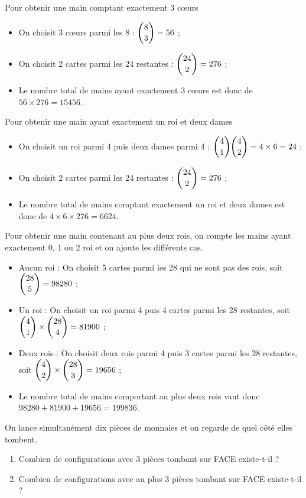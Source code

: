 \documentclass[11pt,fleqn, openany]{book} %
\begin{document}
\begin{solution}Pour obtenir une main comptant exactement 3 cœurs
\begin{itemize}
\item On choisit 3 cœurs parmi les 8 : $\dbinom{8}{3}=56$ ;
\item On choisit 2 cartes parmi les 24 restantes : $\dbinom{24}{2}=276$ ;
\item Le nombre total de mains ayant exactement 3 cœurs est donc de $56 \times 276 = 	15456$.
\end{itemize}

Pour obtenir une main ayant exactement un roi et deux dames
\begin{itemize}
\item On choisit un roi parmi 4 puis deux dames parmi 4 : $\dbinom{4}{1} \dbinom{4}{2}=4 \times 6 = 24$ ;
\item On choisit 2 cartes parmi les 24 restantes : $\dbinom{24}{2}=276$ ;
\item Le nombre total de mains comptant exactement un roi et deux dames est donc de $4 \times 6 \times 276=6624$.\end{itemize}

Pour obtenir une main contenant au plus deux rois, on compte les mains ayant exactement 0, 1 ou 2 roi et on ajoute les différents cas.
\begin{itemize}
\item Aucun roi : On choisit 5 cartes parmi les 28 qui ne sont pas des rois, soit $\dbinom{28}{5}=98280$ ;
\item Un roi : On choisit un roi parmi 4 puis 4 cartes parmi les 28 restantes, soit $\dbinom{4}{1} \times \dbinom{28}{4}=81900$ ;
\item Deux rois : On choisit deux rois parmi 4 puis 3 cartes parmi les 28 restantes, soit $\dbinom{4}{2} \times \dbinom{28}{3}=19656$ ;
\item Le nombre total de mains comportant au plus deux rois vaut donc $98280+81900+19656=199836$.
\end{itemize}\end{solution}





\begin{exercise}
On lance simultanément dix pièces de monnaies et on regarde de quel côté elles tombent.
\begin{enumerate}
\item Combien de configurations avec 3 pièces tombant sur FACE existe-t-il ?
\item Combien de configurations avec au plus 3 pièces tombant sur FACE existe-t-il ?
\end{enumerate}\end{exercise}
\end{document}
